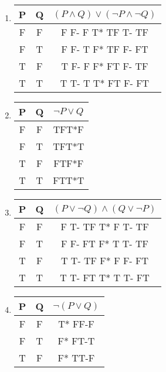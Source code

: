 \documentclass{article}
\begin{document}
\begin{enumerate}[label=(\alph*)]
  \item 
\begin{center}
 \begin{tabular}{||c c c ||} 
 \hline
 P & Q & $(P\land Q) \lor (\neg P \land \neg Q) $ \\ [0.5ex] 
 \hline\hline
 F & F & F F- F T* TF T- TF\\ 
 \hline
 F & T & F F- T F* TF F- FT\\
 \hline
 T & F & T F- F F* FT F- TF\\
 \hline
 T & T & T T- T T* FT F- FT\\ [1ex] 
 \hline
\end{tabular}
\end{center}
\item
\begin{center}
 \begin{tabular}{||c c c ||} 
 \hline
 P & Q & $\neg P \lor Q$ \\ [0.5ex] 
 \hline\hline
 F & F & TFT*F\\ 
 \hline
 F & T & TFT*T\\
 \hline
 T & F & FTF*F\\
 \hline
 T & T & FTT*T\\ [1ex] 
 \hline
\end{tabular}
\end{center}
\item
\begin{center}
 \begin{tabular}{||c c c ||} 
 \hline
 P & Q & $(P\lor \neg Q) \land (Q \lor \neg P) $ \\ [0.5ex] 
 \hline\hline
 F & F & F T- TF T* F T- TF\\ 
 \hline
 F & T & F F- FT F* T T- TF\\
 \hline
 T & F & T T- TF F* F F- FT\\
 \hline
 T & T & T T- FT T* T T- FT\\ [1ex] 
 \hline
\end{tabular}
\end{center}
\item
\begin{center}
 \begin{tabular}{||c c c ||} 
 \hline
 P & Q & $\neg (P \lor Q) $\\ [0.5ex] 
 \hline\hline
 F & F & T* FF-F\\ 
 \hline
 F & T & F* FT-T\\
 \hline
 T & F & F* TT-F\\

\end{tabular}
\end{center}
\end{enumerate}
\end{document}

